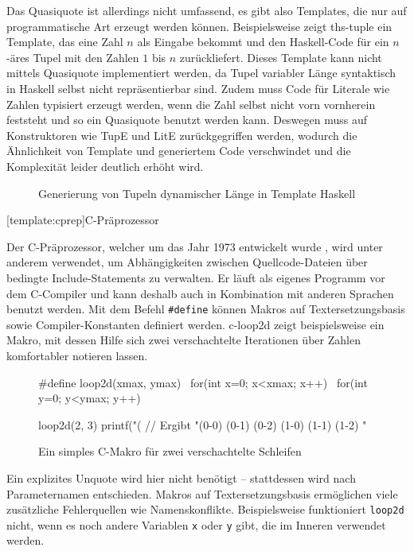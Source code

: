 \documentclass[11pt, a4paper, bibgerm]{scrbook}
\newenvironment{DIFnomarkup}{}{}
\newcommand\icode[1]{\lstinline?#1?}
\newcommand\lsection{}
\newcommand\abb{}
\begin{document}
Das Quasiquote ist allerdings nicht umfassend, es gibt also Templates, die
nur auf programmatische Art erzeugt werden können. Beispielsweise zeigt
\abb{ths-tuple} ein Template, das eine Zahl $n$ als Eingabe bekommt und
den Haskell-Code für ein $n$-äres Tupel mit den Zahlen $1$ bis $n$
zurückliefert. Dieses Template kann nicht mittels Quasiquote implementiert
werden, da Tupel variabler Länge syntaktisch in Haskell selbst nicht
repräsentierbar sind. Zudem muss Code für Literale wie Zahlen typisiert
erzeugt werden, wenn die Zahl selbst nicht vorn vornherein feststeht und
so ein Quasiquote benutzt werden kann. Deswegen muss auf Konstruktoren wie
TupE und LitE zurückgegriffen werden, wodurch die Ähnlichkeit von
Template und generiertem Code verschwindet und die Komplexität leider
deutlich erhöht wird.

\begin{figure}[h]
  \centering
  \begin{DIFnomarkup}\end{DIFnomarkup} %
  \caption{Generierung von Tupeln dynamischer Länge in Template Haskell}
  \label{magicl:fig:ths-tuple}
\end{figure}

\lsection[template:cprep]{C-Präprozessor}

Der C-Präprozessor, welcher um das Jahr 1973 entwickelt
wurde \cite{CPrep}, wird unter anderem verwendet, um Abhängigkeiten
zwischen Quellcode-Dateien über bedingte Include-Statements zu
verwalten. Er läuft als eigenes Programm vor dem C-Compiler und kann
deshalb auch in Kombination mit anderen Sprachen benutzt werden. Mit
dem Befehl \icode{#define} können Makros auf Textersetzungsbasis sowie
Compiler-Konstanten definiert werden. \abb{c-loop2d} zeigt
beispielsweise ein Makro, mit dessen Hilfe sich zwei verschachtelte
Iterationen über Zahlen komfortabler notieren lassen.
\begin{figure}[h]
  \centering
  \begin{DIFnomarkup}\begin{code}
#define loop2d(xmax, ymax)   \
  for(int x=0; x<xmax; x++)  \
   for(int y=0; y<ymax; y++)

loop2d(2, 3) {
  printf("(%
}
// Ergibt "(0-0) (0-1) (0-2) (1-0) (1-1) (1-2) "
  \end{code}\end{DIFnomarkup}
\caption{Ein simples C-Makro für zwei verschachtelte Schleifen}
  \label{magicl:fig:c-loop2d}
\end{figure}
Ein explizites Unquote wird hier nicht benötigt -- stattdessen wird nach
Parameternamen entschieden. Makros auf Textersetzungsbasis ermöglichen
viele zusätzliche Fehlerquellen wie Namenskonflikte. Beispielsweise
funktioniert \icode{loop2d} nicht, wenn es noch andere Variablen
\icode{x} oder \icode{y} gibt, die im Inneren verwendet werden.
\end{document}
